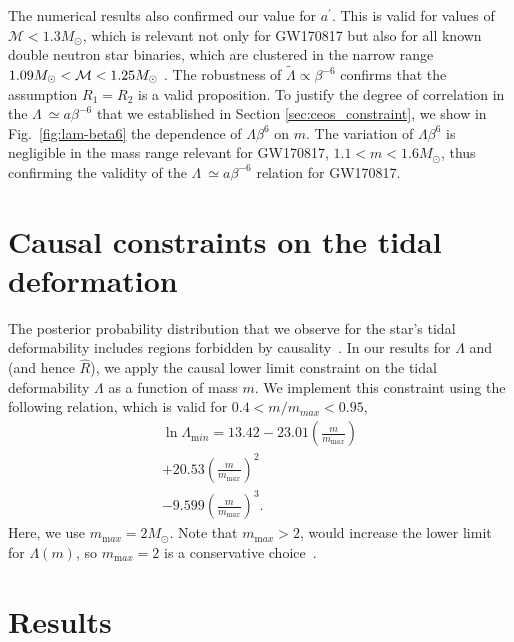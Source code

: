 The numerical results also confirmed our value for $a^\prime$. This is valid for values of $\mathcal{M} < 1.3 M_\odot$, which is relevant not only for GW170817 but also for all known double neutron star binaries, which are clustered in the narrow range $1.09M_\odot<{\cal M}<1.25M_\odot$ \cite{Tauris:2017omb,Ozel:2016oaf,Lattimer:2012nd}. The robustness of $\tilde{\Lambda}\propto\beta^{-6}$ confirms that the assumption $R_1=R_2$ is a valid proposition. To justify the degree of correlation in the $\Lambda~\simeq a\beta^{-6}$ that we established in Section \ref{sec:ceos_constraint}, we show in Fig.~\ref{fig:lam-beta6} the dependence of $\Lambda \beta^{6}$ on $m$. The variation of $\Lambda \beta^{6}$ is negligible in the mass range relevant for GW170817, $1.1 < m < 1.6 M_\odot$, thus confirming the validity of the $\Lambda~\simeq a\beta^{-6}$ relation for GW170817.

\section{Causal constraints on the tidal deformation}

The posterior probability distribution that we observe for the star's tidal deformability includes regions forbidden by causality~\cite{Zhao:2018nyf}. In our results for $\Lambda$ and (and hence $\hat{R}$), we apply the causal lower limit constraint on the tidal deformability $\Lambda$ as a function of mass $m$. We implement this constraint using the following relation, which is valid for $0.4 < m/m_{max} < 0.95$,
\begin{equation}
\begin{split}
\ln\Lambda_{\mathrm min} = 13.42 - 23.01\left(\frac{m}{m_{\mathrm max}}\right) \\
+ 20.53 \left(\frac{m}{m_{\mathrm max}}\right)^2 \\
- 9.599\left(\frac{m}{m_{\mathrm max}}\right)^3.
\end{split}
\end{equation}
Here, we use $m_{\mathrm max} = 2 M_\odot$. Note that $m_{\mathrm max} > 2$, would increase the lower limit for $\Lambda(m)$, so $m_{\mathrm max}=2$ is a conservative choice~\cite{Zhao:2018nyf}.


\section{Results}


